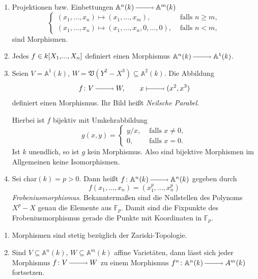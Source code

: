 \documentclass[a4paper,12pt,index=toc]{scrbook}
\theoremstyle{keinenummern} %
\def\A{\mathbb{A}}
\def\V{\mathfrak{V}}
\newcommand{\FF}{\mathbb{F}}
\renewcommand{\dotsc}{\ensuremath{\!...}}
\newcommand{\polyx}[1][n]{\ensuremath%
  [X_{1},\dotsc,X_{#1}]}
\begin{document}
\begin{bsp}\label{1.4.3}
\begin{enumerate}
\item{}  Projektionen bzw. Einbettungen $\A^{n}(k)\ra \A^{m}(k)$ 
\begin{equation*}\begin{cases} (x_1,\dotsc,x_n) \mapsto (x_1,\dotsc,x_m),&\text{ falls }n\ge m, \\ (x_1,\dotsc,x_n)\mapsto (x_1,\dotsc,x_n,0,\dotsc,0),&\text{ falls }n<m, \end{cases}\end{equation*} sind Morphismen.
\item{} Jedes $f \in k\polyx$ definiert einen Morphismus $\A^{n}(k)\ra \A^{1}(k)$.
\item{} Seien $V=\A^1(k)$, $W=\V(Y^2-X^3) \subseteq \A^2(k)$. Die Abbildung 
\begin{equation*}f\colon V\ra W, \qquad x\mapsto (x^2,x^3)\end{equation*}
definiert einen Morphismus. Ihr Bild heißt \emph{Neilsche Parabel}.

Hierbei ist $f$ bijektiv mit Umkehrabbildung 
\begin{equation*}g(x,y)=\begin{cases} y/x,&\text{ falls }x\neq 0, \\ 0,&\text{ falls }x=0. \end{cases}\end{equation*}
Ist $k$ unendlich, so ist $g$ kein Morphismus. Also sind bijektive Morphismen im Allgemeinen keine Isomorphismen.
\item{} Sei char$(k)=p>0$. Dann heißt $f\colon \A^n(k)\ra \A^n(k)$ gegeben durch 
\begin{equation*}f(x_1,\dotsc,x_n)=(x_1^p,\dotsc,x_n^p)\end{equation*} 
\emph{Frobeniusmorphismus}. Bekanntermaßen sind die Nullstellen des Polynoms $X^{p}-X$ genau die Elemente aus $\FF_p$. Damit sind die Fixpunkte des Frobeniusmorphismus gerade die Punkte mit Koordinaten in $\FF_p$.
\end{enumerate}
\end{bsp}

\begin{bem}\label{1.4.4}
\begin{enumerate}
\item{} Morphismen sind stetig bezüglich der Zariski-Topologie.
\item{} Sind $V\subseteq \A^n(k)$, $W \subseteq \A^m(k)$ affine Varietäten, dann lässt sich jeder Morphismus $f\colon V\ra W$ zu einem Morphismus $f^n\colon \A^n(k)\ra A^m(k)$ fortsetzen.
\end{enumerate}
\end{bem}
\end{document}
